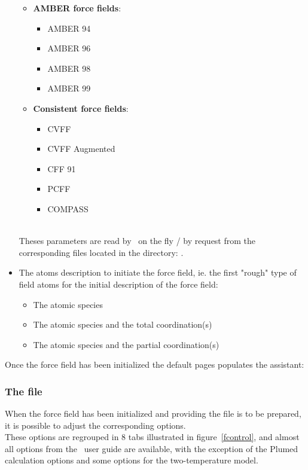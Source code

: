 \begin{itemize}
{{\begin{minipage}{7cm}
\begin{itemize}
\item {\bf{AMBER force fields}}:
\begin{itemize}
\item AMBER 94
\item AMBER 96
\item AMBER 98
\item AMBER 99 \\
\end{itemize}
\item {\bf{Consistent force fields}}:
\begin{itemize}
\item CVFF
\item CVFF Augmented
\item CFF 91
\item PCFF
\item COMPASS
\end{itemize}
\end{itemize}
\end{minipage}
}}
\\[0.5cm]
Theses parameters are read by \atomes\ on the fly / by request from the corresponding files located in the directory: \mbox{}. 
\item The atoms description to initiate the force field, ie. the first "rough" type of field atoms for the initial description of the force field:
\begin{itemize}
\item The atomic species
\item The atomic species and the total coordination(s)
\item The atomic species and the partial coordination(s)
\end{itemize}
\end{itemize}
Once the force field has been initialized the default pages populates the assistant: \\ 

\subsubsection{The  file}

When the force field has been initialized and providing the  file is to be prepared, it is possible to adjust the corresponding options. \\
These options are regrouped in 8 tabs illustrated in figure~\ref{fcontrol}, 
and almost all options from the \dlpoly\ user guide are available, 
with the exception of the Plumed calculation options and some options for the two-temperature  model.


